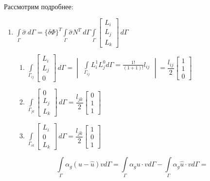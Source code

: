 	Рассмотрим подробнее:
	\begin{enumerate}
		\item $
		\displaystyle\int\limits_{\Gamma} \hat \sigma \ d\Gamma = \{\delta \Phi\}^T \int\limits_{\Gamma} \hat \sigma N^T\ d\Gamma\int\limits_{\Gamma} \begin{bmatrix}
			L_i \\ L_j \\ L_k
		\end{bmatrix} \, d\Gamma$
		\begin{enumerate}
			\item $\displaystyle\int\limits_{\Gamma_{ij}} \begin{bmatrix}
				L_i \\ L_j \\ 0
			\end{bmatrix} \, d\Gamma = 
			\begin{vmatrix}
			\displaystyle\int\limits_{\Gamma_{ij}} L_i^1 L_j^0 d\Gamma = \frac{1!}{(1+1)!} l_{ij}
			\end{vmatrix}= \dfrac{l_{ij}}{2}\begin{bmatrix}
			1\\1\\0
		\end{bmatrix}$
		\item $\displaystyle\int\limits_{\Gamma_{jk}} \begin{bmatrix}
				0 \\ L_j \\ L_k
			\end{bmatrix} \, d\Gamma = \dfrac{l_{jk}}{2}\begin{bmatrix}
			0\\1\\1
		\end{bmatrix}$
		\item $\displaystyle\int\limits_{\Gamma_{ik}} \begin{bmatrix}
				L_i \\ 0 \\ L_k
			\end{bmatrix} \, d\Gamma = \dfrac{l_{jk}}{2}\begin{bmatrix}
			1\\0\\1
		\end{bmatrix}$
		\end{enumerate}
	\[\int \limits_{\Gamma} \alpha_g (u - \hat u) v d \Gamma = \int \limits_{\Gamma} \alpha_g u \cdot v d \Gamma - \int \limits_{\Gamma} \alpha_g \hat u \cdot v d \Gamma = \]

\end{enumerate}
